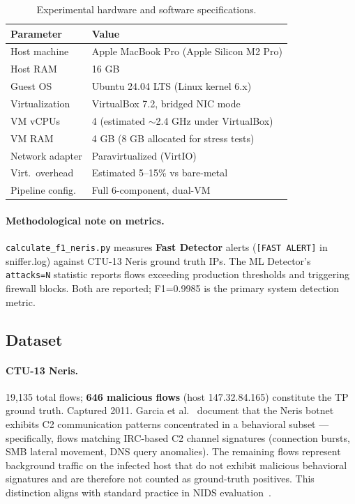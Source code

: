\documentclass[11pt,a4paper]{article}
\begin{document}
\begin{table}[h]
\centering
\caption{Experimental hardware and software specifications.}
\label{tab:setup}
\begin{tabular}{ll}
\toprule
\textbf{Parameter} & \textbf{Value} \\
\midrule
Host machine       & Apple MacBook Pro (Apple Silicon M2 Pro) \\
Host RAM           & 16 GB \\
Guest OS           & Ubuntu 24.04 LTS (Linux kernel 6.x) \\
Virtualization     & VirtualBox 7.2, bridged NIC mode \\
VM vCPUs           & 4 (estimated ${\sim}$2.4 GHz under VirtualBox) \\
VM RAM             & 4 GB (8 GB allocated for stress tests) \\
Network adapter    & Paravirtualized (VirtIO) \\
Virt.\ overhead    & Estimated 5--15\% vs bare-metal \\
Pipeline config.   & Full 6-component, dual-VM \\
\bottomrule
\end{tabular}
\end{table}

\paragraph{Methodological note on metrics.}
\texttt{calculate\_f1\_neris.py} measures \textbf{Fast Detector} alerts
(\texttt{[FAST ALERT]} in sniffer.log) against CTU-13 Neris ground truth IPs. The ML
Detector's \texttt{attacks=N} statistic reports flows exceeding production thresholds and
triggering firewall blocks. Both are reported; F1=0.9985 is the primary system detection
metric.

\subsection{Dataset}

\paragraph{CTU-13 Neris.}
19,135 total flows; \textbf{646 malicious flows} (host 147.32.84.165) constitute the TP
ground truth. Captured 2011. Garcia et al.~\cite{garcia2014} document that the Neris botnet
exhibits C2 communication patterns concentrated in a behavioral subset --- specifically,
flows matching IRC-based C2 channel signatures (connection bursts, SMB lateral movement, DNS
query anomalies). The remaining flows represent background traffic on the infected host that
do not exhibit malicious behavioral signatures and are therefore not counted as ground-truth
positives. This distinction aligns with standard practice in NIDS
evaluation~\cite{sharafaldin2018,mirsky2018}.
\end{document}
